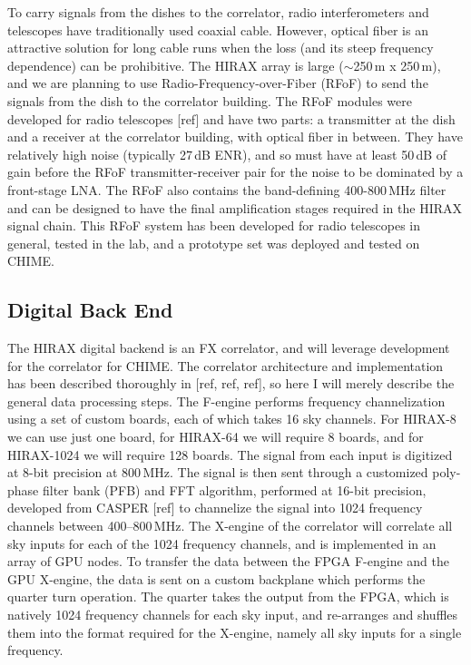\documentclass[]{spie}  %
\begin{document}
To carry signals from the dishes to the correlator, radio interferometers and telescopes have traditionally used coaxial cable. However, optical fiber is an attractive solution for long cable runs when the loss (and its steep frequency dependence) can be prohibitive. The HIRAX array is large ($\sim$250\,m x 250\,m), and we are planning to use Radio-Frequency-over-Fiber (RFoF) to send the signals from the dish to the correlator building. The RFoF modules were developed for radio telescopes [ref] and have two parts: a transmitter at the dish and a receiver at the correlator building, with optical fiber in between. They have relatively high noise (typically 27\,dB ENR), and so must have at least 50\,dB of gain before the RFoF transmitter-receiver pair for the noise to be dominated by a front-stage LNA. The RFoF also contains the band-defining 400-800\,MHz filter and can be designed to have the final amplification stages required in the HIRAX signal chain. This RFoF system has been developed for radio telescopes in general, tested in the lab, and a prototype set was deployed and tested on CHIME. \newline      

\subsection{Digital Back End}

The HIRAX digital backend is an FX correlator, and will leverage development for the correlator for CHIME. The correlator architecture and implementation has been described thoroughly in [ref, ref, ref], so here I will merely describe the general data processing steps. The F-engine performs frequency channelization using a set of custom boards, each of which takes 16 sky channels. For HIRAX-8 we can use just one board, for HIRAX-64 we will require 8 boards, and for HIRAX-1024 we will require 128 boards. The signal from each input is digitized at 8-bit precision at 800\,MHz. The signal is then sent through a customized poly-phase filter bank (PFB) and FFT algorithm, performed at 16-bit precision, developed from CASPER [ref] to channelize the signal into 1024 frequency channels between 400--800\,MHz. The X-engine of the correlator will correlate all sky inputs for each of the 1024 frequency channels, and is implemented in an array of GPU nodes. To transfer the data between the FPGA F-engine and the GPU X-engine, the data is sent on a custom backplane which performs the quarter turn operation. The quarter takes the output from the FPGA, which is natively 1024 frequency channels for each sky input, and re-arranges and shuffles them into the format required for the X-engine, namely all sky inputs for a single frequency. \newline
\end{document}
